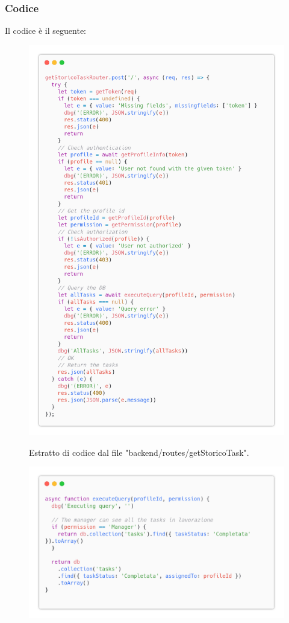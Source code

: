 \documentclass{report}
\begin{document}
\subsubsection*{Codice}

Il codice è il seguente:
\begin{figure}[H]
	\centering\includegraphics[width=1\textwidth]{images/code_storico.png}

	Estratto di codice dal file "backend/routes/getStoricoTask".
\end{figure}
\begin{figure}[H]
	\centering\includegraphics[width=1\textwidth]{images/code_storico2.png}
\end{figure}
\end{document}
